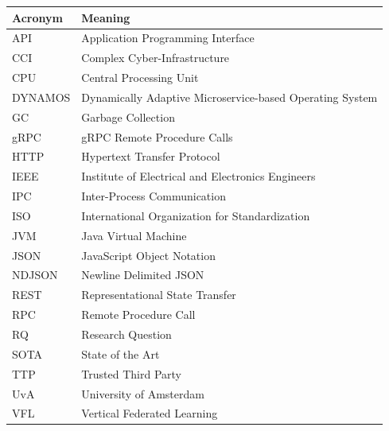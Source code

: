 \begin{center}
\begin{tabular}{@{}lp{}@{}}
\toprule
Acronym & Meaning \\
\midrule
API & Application Programming Interface \\
CCI & Complex Cyber-Infrastructure \\
CPU & Central Processing Unit \\
DYNAMOS & Dynamically Adaptive Microservice-based Operating System \\
GC & Garbage Collection \\
gRPC & gRPC Remote Procedure Calls \\
HTTP & Hypertext Transfer Protocol \\
IEEE & Institute of Electrical and Electronics Engineers \\
IPC & Inter-Process Communication \\
ISO & International Organization for Standardization \\
JVM & Java Virtual Machine \\
JSON & JavaScript Object Notation \\
NDJSON & Newline Delimited JSON \\
REST & Representational State Transfer \\
RPC & Remote Procedure Call \\
RQ & Research Question \\
SOTA & State of the Art \\
TTP & Trusted Third Party \\
UvA & University of Amsterdam \\
VFL & Vertical Federated Learning \\
\bottomrule
\end{tabular}
\end{center}

